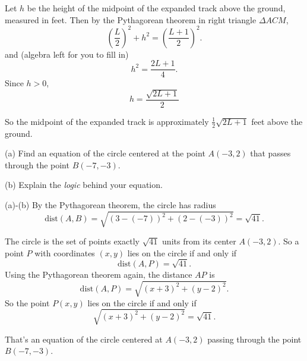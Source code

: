 \documentclass{ximera}
\begin{document}
\begin{question}
\begin{explanation}
Let $h$ be the height of the midpoint of the expanded track above the ground, measured in feet. Then by the Pythagorean theorem in right triangle $\Delta ACM$,
\[
    \left(  \frac{L}{2} \right)^2  + h^2 =    \left( \frac{L+1}{2} \right)^2 .
\]
and (algebra left for you to fill in)
\[
      h^2 = \frac{2L+1}{4} .
\]
Since $h>0$,
\[
    h = \frac{\sqrt{2L+1}}{2}
\]

So the midpoint of the expanded track is approximately $\frac{1}{2}\sqrt{2L+1}$ feet above the ground.

\end{explanation}


\end{question}


\begin{question}  \label{Q8dsf8r3tg;lyhg}
(a) Find an equation of the circle centered at the point $A(-3,2)$ that passes through the point $B(-7,-3)$. 

(b) Explain the \emph{logic} behind your equation. 

\begin{explanation}

(a)-(b) By the Pythagorean theorem, the circle has radius 
\[
       \text{dist}(A,B) = \sqrt{(3-(-7))^2 + (2-(-3))^2} = \sqrt{41} .
\]

The circle is the set of points exactly $\sqrt{41}$ units from its center $A(-3,2)$. So a point $P$ with coordinates $(x,y)$ lies on the circle if and only if 
\[
  \text{dist} (A,P) = \sqrt{41} .
\]
Using the Pythagorean theorem again, the distance $AP$ is
\[
        \text{dist} (A,P) = \sqrt{(x+3)^2 + (y-2)^2} .
\]
So the point $P(x,y)$ lies on the circle if and only if 
\[
   \sqrt{(x+3)^2 + (y-2)^2} = \sqrt{41}.
\]

That's an equation of the circle centered at $A(-3,2)$ passing through the point $B(-7,-3)$.


\end{explanation}



\end{question}


\end{document}
